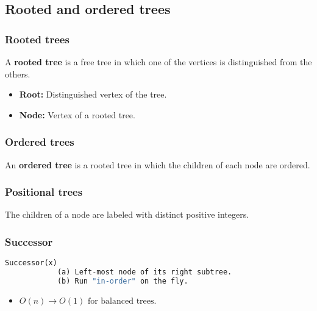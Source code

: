 \subsection{Rooted and ordered trees}
    \subsubsection{Rooted trees}
    \begin{definition}
        A \textbf{rooted tree} is a free tree in which one of the vertices is distinguished from the others.
        \begin{itemize}
            \item \textbf{Root:} Distinguished vertex of the tree.
            \item \textbf{Node:} Vertex of a rooted tree.
        \end{itemize}
    \end{definition}
    
    \subsubsection{Ordered trees}
    \begin{definition}
        An \textbf{ordered tree} is a rooted tree in which the children of each node are ordered.
    \end{definition}


    \subsubsection{Positional trees}
    \begin{definition}
        The children of a node are labeled with distinct positive integers.
    \end{definition}



\subsubsection{Successor}
\begin{definition}
    \begin{lstlisting}[language=Python, caption={Successor}]
        Successor(x)
            (a) Left-most node of its right subtree.
            (b) Run "in-order" on the fly.
    \end{lstlisting}

    \begin{itemize}
        \item $O(n) \rightarrow O(1) \text{ for balanced trees}.$
    \end{itemize}
\end{definition}

